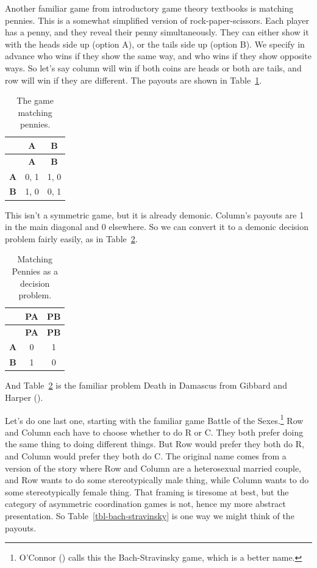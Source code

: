 \documentclass[
  12pt,
  letterpaper,
  DIV=11,
  numbers=noendperiod]{scrreprt}
\begin{document}
Another familiar game from introductory game theory textbooks is
matching pennies. This is a somewhat simplified version of
rock-paper-scissors. Each player has a penny, and they reveal their
penny simultaneously. They can either show it with the heads side up
(option A), or the tails side up (option B). We specify in advance who
wins if they show the same way, and who wins if they show opposite ways.
So let's say column will win if both coins are heads or both are tails,
and row will win if they are different. The payouts are shown in
Table~\ref{tbl-match-pennies}.

\begin{longtable}[]{@{}ccc@{}}
\caption{The game matching
pennies.}\label{tbl-match-pennies}\tabularnewline
\toprule\noalign{}
& \textbf{A} & \textbf{B} \\
\midrule\noalign{}
\endfirsthead
\toprule\noalign{}
& \textbf{A} & \textbf{B} \\
\midrule\noalign{}
\endhead
\bottomrule\noalign{}
\endlastfoot
\textbf{A} & 0, 1 & 1, 0 \\
\textbf{B} & 1, 0 & 0, 1 \\
\end{longtable}

This isn't a symmetric game, but it is already demonic. Column's payouts
are 1 in the main diagonal and 0 elsewhere. So we can convert it to a
demonic decision problem fairly easily, as in
Table~\ref{tbl-death-in-damascus}.

\begin{longtable}[]{@{}ccc@{}}
\caption{Matching Pennies as a decision
problem.}\label{tbl-death-in-damascus}\tabularnewline
\toprule\noalign{}
& \textbf{PA} & \textbf{PB} \\
\midrule\noalign{}
\endfirsthead
\toprule\noalign{}
& \textbf{PA} & \textbf{PB} \\
\midrule\noalign{}
\endhead
\bottomrule\noalign{}
\endlastfoot
\textbf{A} & 0 & 1 \\
\textbf{B} & 1 & 0 \\
\end{longtable}

And Table~\ref{tbl-death-in-damascus} is the familiar problem Death in
Damascus from Gibbard and Harper
().

Let's do one last one, starting with the familiar game Battle of the
Sexes.\footnote{O'Connor () calls this
  the Bach-Stravinsky game, which is a better name.} Row and Column each
have to choose whether to do R or C. They both prefer doing the same
thing to doing different things. But Row would prefer they both do R,
and Column would prefer they both do C. The original name comes from a
version of the story where Row and Column are a heterosexual married
couple, and Row wants to do some stereotypically male thing, while
Column wants to do some stereotypically female thing. That framing is
tiresome at best, but the category of asymmetric coordination games is
not, hence my more abstract presentation. So
Table~\ref{tbl-bach-stravinsky} is one way we might think of the
payouts.
\end{document}
